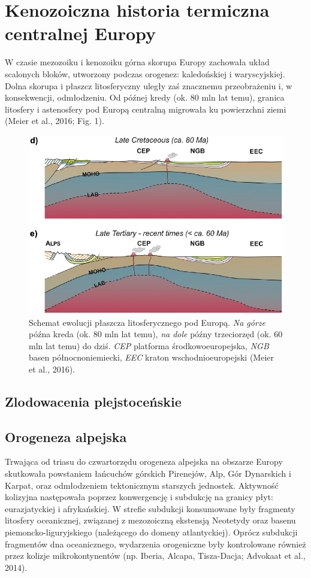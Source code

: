 \documentclass[11.5pt,twoside]{report}
\begin{document}
	
	\tableofcontents
	
	\chapter{Kenozoiczna historia termiczna centralnej Europy}
	
W czasie mezozoiku i kenozoiku górna skorupa Europy zachowała układ scalonych bloków, utworzony podczas orogenez: kaledońskiej i waryscyjskiej. Dolna skorupa i płaszcz litosferyczny uległy zaś znacznemu przeobrażeniu i, w konsekwencji, odmłodzeniu. Od pó\'{z}nej kredy (ok. 80 mln lat temu), granica litosfery i astenosfery pod Europą centralną migrowała ku powierzchni ziemi (Meier et al., 2016; Fig. 1). 

\begin{figure}[h]
	\centering
	\includegraphics[width=0.5\linewidth]{../Termika/Meier2016}
	\caption{Schemat ewolucji płaszcza litosferycznego pod Europą. \textit{Na górze} późna kreda (ok. 80 mln lat temu), \textit{na dole} późny trzeciorzęd (ok. 60 mln lat temu) do dziś. \textit{CEP} platforma środkowoeuropejska, \textit{NGB} basen północnoniemiecki, \textit{EEC} kraton wschodnioeuropejski (Meier et al., 2016).}
	\label{Fig.}
\end{figure}
	
	\section{Zlodowacenia plejstoceńskie}
	

	
	\section{Orogeneza alpejska}
	
Trwająca od triasu do czwartorzędu orogeneza alpejska na obszarze Europy skutkowała powstaniem łańcuchów górskich Pirenejów, Alp, Gór Dynarskich i Karpat, oraz odmłodzeniem tektonicznym starszych jednostek. Aktywność kolizyjna następowała poprzez konwergencję i subdukcję na granicy płyt: eurazjatyckiej i afrykańskiej. W strefie subdukcji konsumowane były fragmenty litosfery oceanicznej, związanej z mezozoiczną ekstensją Neotetydy oraz basenu piemoncko-liguryjskiego (należącego do domeny atlantyckiej). Oprócz subdukcji fragmentów dna oceanicznego, wydarzenia orogeniczne były kontrolowane również przez kolizje mikrokontynentów (np. Iberia, Alcapa, Tisza-Dacja; Advokaat et al., 2014).
	
\end{document}
